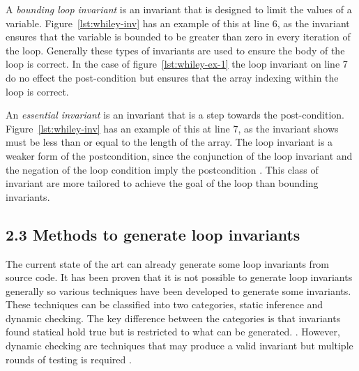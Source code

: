 A \textit{bounding loop invariant} is an invariant that is designed
to limit the values of a variable.
Figure~\ref{lst:whiley-inv} has an example of this at line 6, as the invariant
ensures that the variable  is bounded to be greater than zero
in every iteration of the loop.
Generally these types of invariants are used to ensure the body of the loop
is correct. In the case of figure~\ref{lst:whiley-ex-1} the loop invariant on line
7 do no effect the post-condition but ensures that the array indexing within
the loop is correct.

An \textit{essential invariant} is an invariant that is a step towards the
post-condition.
Figure~\ref{lst:whiley-inv} has an example of this at line 7,
as the invariant shows  must be less than or
equal to the length of the  array.
The loop invariant is a weaker form of the postcondition,
since the conjunction of the loop invariant and the negation
of the loop condition imply the postcondition \cite{invarints-classifiction}.
This class of invariant are more tailored to achieve
the goal of the loop than bounding invariants.


\subsection*{2.3 Methods to generate loop invariants}

The current state of the art can already generate some loop invariants
from source code.
It has been proven that it is not possible to generate loop invariants
generally %
so various techniques have been developed to generate some invariants.
These techniques can be classified into two categories,
static inference and dynamic checking.
The key difference between the categories is
that invariants found statical hold true
but is restricted to what can be generated.
\cite{benderfinding}\cite{Leino2005LoopIO}.
However, dynamic
checking are techniques that may produce a valid invariant
but multiple rounds of testing is required
\cite{infer-dynamic}
\cite{infer-postconditions}.


